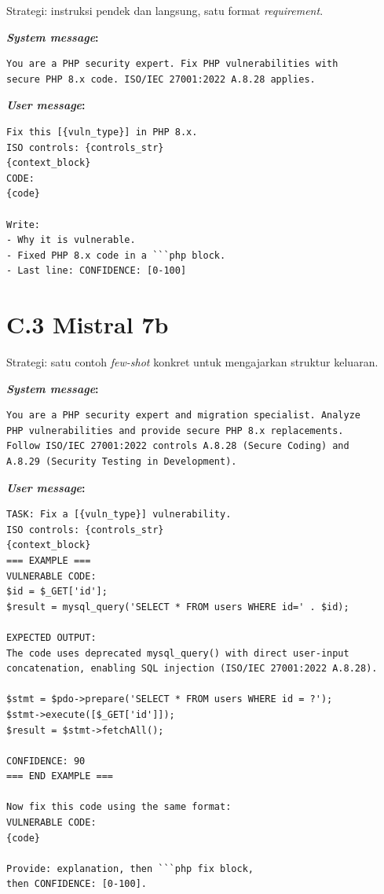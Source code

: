 Strategi: instruksi pendek dan langsung, satu format \textit{requirement}.

\textbf{\textit{System message}:}
\begin{small}
\begin{lstlisting}[style=promptstyle]
You are a PHP security expert. Fix PHP vulnerabilities with
secure PHP 8.x code. ISO/IEC 27001:2022 A.8.28 applies.
\end{lstlisting}
\end{small}
\newpage
\textbf{\textit{User message}:}
\begin{small}
\begin{lstlisting}[style=promptstyle]
Fix this [{vuln_type}] in PHP 8.x.
ISO controls: {controls_str}
{context_block}
CODE:
{code}

Write:
- Why it is vulnerable.
- Fixed PHP 8.x code in a ```php block.
- Last line: CONFIDENCE: [0-100]
\end{lstlisting}
\end{small}

\section*{C.3 Mistral 7b}

Strategi: satu contoh \textit{few-shot} konkret untuk mengajarkan 
struktur keluaran.

\textbf{\textit{System message}:}
\begin{small}
\begin{lstlisting}[style=promptstyle]
You are a PHP security expert and migration specialist. Analyze
PHP vulnerabilities and provide secure PHP 8.x replacements.
Follow ISO/IEC 27001:2022 controls A.8.28 (Secure Coding) and
A.8.29 (Security Testing in Development).
\end{lstlisting}
\end{small}

\textbf{\textit{User message}:}
\begin{small}
\begin{lstlisting}[style=promptstyle]
TASK: Fix a [{vuln_type}] vulnerability.
ISO controls: {controls_str}
{context_block}
=== EXAMPLE ===
VULNERABLE CODE:
$id = $_GET['id'];
$result = mysql_query('SELECT * FROM users WHERE id=' . $id);

EXPECTED OUTPUT:
The code uses deprecated mysql_query() with direct user-input
concatenation, enabling SQL injection (ISO/IEC 27001:2022 A.8.28).

$stmt = $pdo->prepare('SELECT * FROM users WHERE id = ?');
$stmt->execute([$_GET['id']]);
$result = $stmt->fetchAll();

CONFIDENCE: 90
=== END EXAMPLE ===

Now fix this code using the same format:
VULNERABLE CODE:
{code}

Provide: explanation, then ```php fix block, 
then CONFIDENCE: [0-100].

\end{lstlisting}
\end{small}

